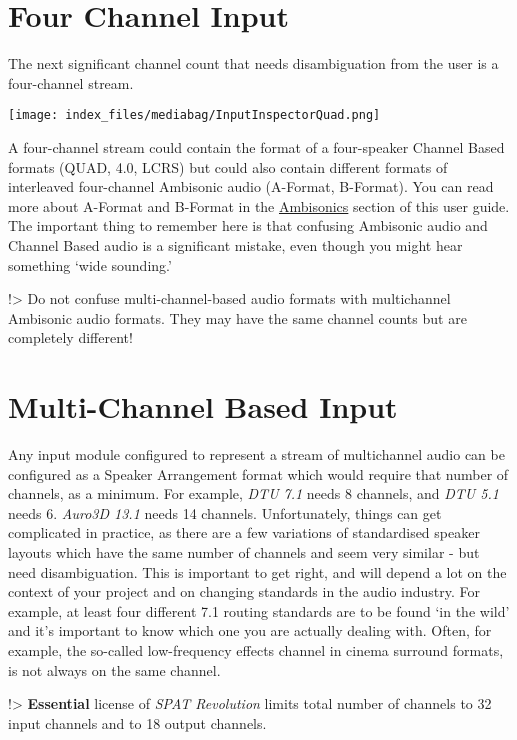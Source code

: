\documentclass[
  letterpaper,
  DIV=11,
  numbers=noendperiod]{scrreport}
\begin{document}
\hypertarget{four-channel-input}{%
\section{Four Channel Input}\label{four-channel-input}}

The next significant channel count that needs disambiguation from the
user is a four-channel stream.

\texttt{[image: index\_files/mediabag/InputInspectorQuad.png]}

A four-channel stream could contain the format of a four-speaker Channel
Based formats (QUAD, 4.0, LCRS) but could also contain different formats
of interleaved four-channel Ambisonic audio (A-Format, B-Format). You
can read more about A-Format and B-Format in the
\href{Scene_based_streams.md}{Ambisonics} section of this user guide.
The important thing to remember here is that confusing Ambisonic audio
and Channel Based audio is a significant mistake, even though you might
hear something `wide sounding.'

!\textgreater{} Do not confuse multi-channel-based audio formats with
multichannel Ambisonic audio formats. They may have the same channel
counts but are completely different!

\hypertarget{multi-channel-based-input}{%
\section{Multi-Channel Based Input}\label{multi-channel-based-input}}

Any input module configured to represent a stream of multichannel audio
can be configured as a Speaker Arrangement format which would require
that number of channels, as a minimum. For example, \emph{DTU 7.1} needs
8 channels, and \emph{DTU 5.1} needs 6. \emph{Auro3D 13.1} needs 14
channels. Unfortunately, things can get complicated in practice, as
there are a few variations of standardised speaker layouts which have
the same number of channels and seem very similar - but need
disambiguation. This is important to get right, and will depend a lot on
the context of your project and on changing standards in the audio
industry. For example, at least four different 7.1 routing standards are
to be found `in the wild' and it's important to know which one you are
actually dealing with. Often, for example, the so-called low-frequency
effects channel in cinema surround formats, is not always on the same
channel.

!\textgreater{} \textbf{Essential} license of \emph{SPAT Revolution}
limits total number of channels to 32 input channels and to 18 output
channels.
\end{document}
